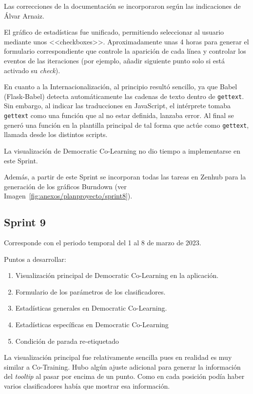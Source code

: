 Las correcciones de la documentación se incorporaron según las indicaciones de
Álvar Arnaiz.

El gráfico de estadísticas fue unificado, permitiendo seleccionar al usuario
mediante unos <<checkboxes>>. Aproximadamente unas 4 horas para generar el
formulario correspondiente que controle la aparición de cada línea y controlar
los eventos de las iteraciones (por ejemplo, añadir siguiente punto solo si está
activado su \textit{check}).

En cuanto a la Internacionalización, al principio resultó sencillo, ya que Babel
(Flask-Babel) detecta automáticamente las cadenas de texto dentro de
\texttt{gettext}. Sin embargo, al indicar las traducciones en JavaScript, el
intérprete tomaba \texttt{gettext} como una función que al no estar definida,
lanzaba error. Al final se generó una función en la plantilla principal de tal
forma que actúe como \texttt{gettext}, llamada desde los distintos scripts.

La visualización de Democratic Co-Learning no dio tiempo a implementarse en este
Sprint.

Además, a partir de este Sprint se incorporan todas las tareas en Zenhub para la
generación de los gráficos Burndown (ver
Imagen~\ref{fig:anexos/planproyecto/sprint8}).



\subsection{Sprint 9}
Corresponde con el periodo temporal del 1 al 8 de marzo de 2023.

Puntos a desarrollar:
\begin{enumerate}
    \item Visualización principal de Democratic Co-Learning en la aplicación.
    \item Formulario de los parámetros de los clasificadores.
    \item Estadísticas generales en Democratic Co-Learning.
    \item Estadísticas específicas en Democratic Co-Learning
    \item Condición de parada re-etiquetado
\end{enumerate}

La visualización principal fue relativamente sencilla pues en realidad es muy
similar a Co-Training. Hubo algún ajuste adicional para generar la información
del \textit{tooltip} al pasar por encima de un punto. Como en cada posición
podía haber varios clasificadores había que mostrar esa información.

